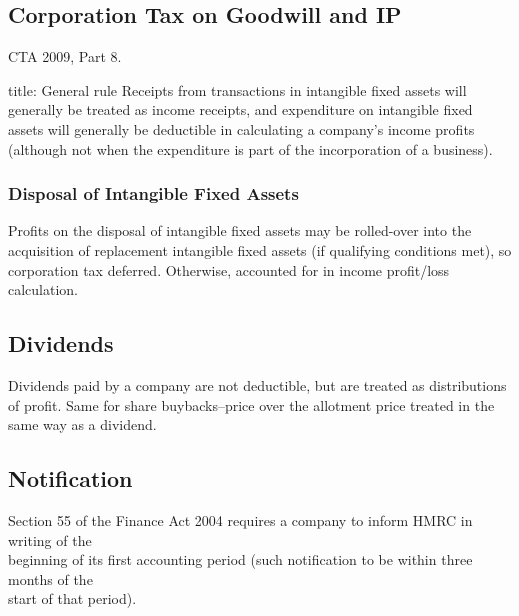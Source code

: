 \documentclass[
]{article}
\newenvironment{Shaded}{}{}
\newcommand{\NormalTok}[1]{#1}
\begin{document}
\hypertarget{corporation-tax-on-goodwill-and-ip}{%
\subsection{Corporation Tax on Goodwill and
IP}\label{corporation-tax-on-goodwill-and-ip}}

CTA 2009, Part 8.

\begin{Shaded}
\begin{Highlighting}[]
\NormalTok{title: General rule}
\NormalTok{Receipts from transactions in intangible fixed assets will generally be treated as income receipts, and expenditure on intangible fixed assets will generally be deductible in calculating a company’s income profits (although not when the expenditure is part of the incorporation of a business).}
\end{Highlighting}
\end{Shaded}

\hypertarget{disposal-of-intangible-fixed-assets}{%
\subsubsection{Disposal of Intangible Fixed
Assets}\label{disposal-of-intangible-fixed-assets}}

Profits on the disposal of intangible fixed assets may be rolled-over
into the acquisition of replacement intangible fixed assets (if
qualifying conditions met), so corporation tax deferred. Otherwise,
accounted for in income profit/loss calculation.

\hypertarget{dividends}{%
\subsection{Dividends}\label{dividends}}

Dividends paid by a company are not deductible, but are treated as
distributions of profit. Same for share buybacks--price over the
allotment price treated in the same way as a dividend.

\hypertarget{notification}{%
\subsection{Notification}\label{notification}}

Section 55 of the Finance Act 2004 requires a company to inform HMRC in
writing of the\\
beginning of its first accounting period (such notification to be within
three months of the\\
start of that period).
\end{document}
